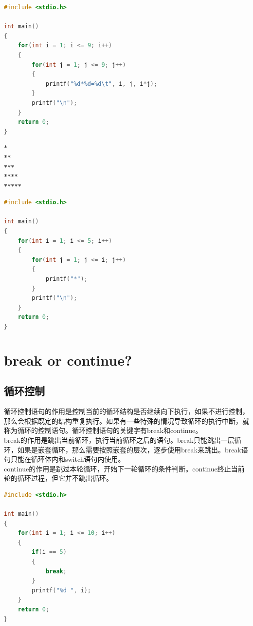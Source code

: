 \begin{lstlisting}[language=C]
#include <stdio.h>

int main()
{
    for(int i = 1; i <= 9; i++)
    {
        for(int j = 1; j <= 9; j++)
        {
            printf("%d*%d=%d\t", i, j, i*j);
        }
        printf("\n");
    }
    return 0;
}
\end{lstlisting}

\vspace{0.5cm}


\begin{lstlisting}
*
**
***
****
*****
\end{lstlisting}

\begin{lstlisting}[language=C]
#include <stdio.h>

int main()
{
    for(int i = 1; i <= 5; i++)
    {
        for(int j = 1; j <= i; j++)
        {
            printf("*");
        }
        printf("\n");
    }
    return 0;
}
\end{lstlisting}

\newpage

\section{break or continue?}

\subsection{循环控制}

循环控制语句的作用是控制当前的循环结构是否继续向下执行，如果不进行控制，那么会根据既定的结构重复执行。如果有一些特殊的情况导致循环的执行中断，就称为循环的控制语句。循环控制语句的关键字有break和continue。\\

break的作用是跳出当前循环，执行当前循环之后的语句。break只能跳出一层循环，如果是嵌套循环，那么需要按照嵌套的层次，逐步使用break来跳出。break语句只能在循环体内和switch语句内使用。\\

continue的作用是跳过本轮循环，开始下一轮循环的条件判断。continue终止当前轮的循环过程，但它并不跳出循环。\\


\begin{lstlisting}[language=C]
#include <stdio.h>

int main()
{
    for(int i = 1; i <= 10; i++)
    {
        if(i == 5)
        {
            break;
        }
        printf("%d ", i);
    }
    return 0;
}
\end{lstlisting}

